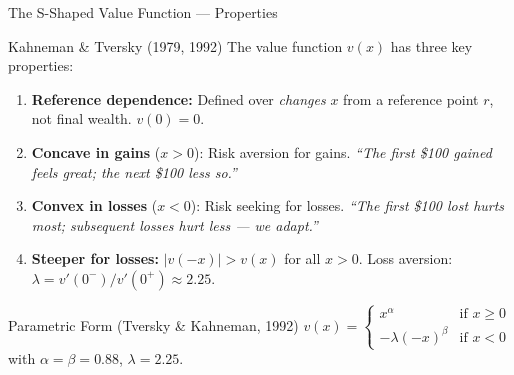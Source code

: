 \documentclass[aspectratio=169]{beamer}
\begin{document}
\begin{frame}{The S-Shaped Value Function --- Properties}
\begin{block}{Kahneman \& Tversky (1979, 1992)}
The value function $v(x)$ has three key properties:
\end{block}
{\small\begin{enumerate}[<+->]
  \item \textbf{Reference dependence:} Defined over \textit{changes} $x$ from a reference point $r$, not final wealth. $v(0) = 0$.
  \item \textbf{Concave in gains} ($x > 0$): Risk aversion for gains. \textit{``The first \$100 gained feels great; the next \$100 less so.''}
  \item \textbf{Convex in losses} ($x < 0$): Risk seeking for losses. \textit{``The first \$100 lost hurts most; subsequent losses hurt less --- we adapt.''}
  \item \textbf{Steeper for losses:} $|v(-x)| > v(x)$ for all $x > 0$. Loss aversion: $\lambda = v'(0^-)/v'(0^+) \approx 2.25$.
\end{enumerate}}
\begin{alertblock}{Parametric Form (Tversky \& Kahneman, 1992)}
$v(x) = \begin{cases} x^\alpha & \text{if } x \geq 0 \\ -\lambda(-x)^\beta & \text{if } x < 0 \end{cases}$\quad with $\alpha = \beta = 0.88$, $\lambda = 2.25$.
\end{alertblock}
\end{frame}
\end{document}
